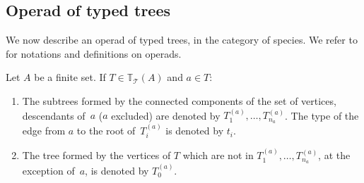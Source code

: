 \documentclass[pdftex]{sigma}
\numberwithin{equation}{section}
\newcommand{\T}{\mathcal{T}}
\newcommand{\bfT}{\mathbb{T}}
\begin{document}
\subsection{Operad of typed trees}

We now describe an operad of typed trees, in the category of species.
We refer to \cite{Dotsenko,Vallette,Markl} for notations and definitions on operads.

\begin{Notation} Let $A$ be a finite set. If $T\in \bfT_\T(A)$ and $a\in T$:
\begin{enumerate}\itemsep=0pt
\item The subtrees formed by the connected components of the set of vertices, descendants of~$a$ ($a$ excluded)
are denoted by $T_1^{(a)},\dots,T_{n_a}^{(a)}$.
The type of the edge from $a$ to the root of~$T_i^{(a)}$ is denoted by $t_i$.
\item The tree formed by the vertices of $T$ which are not in $T_1^{(a)},\dots,T_{n_a}^{(a)}$,
at the exception of~$a$, is denoted by $T_0^{(a)}$.
\end{enumerate}
\end{Notation}
\end{document}
